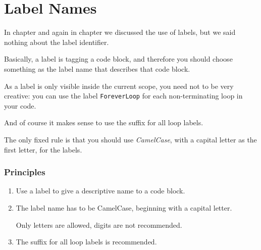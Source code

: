 \section{Label Names}\label{sec:Label}
In chapter  and again in chapter  we discussed the use of labels, but we said nothing about the label identifier.

Basically, a label is tagging a code block, and therefore you should choose something as the label name that describes that code block.

As a label is only visible inside the current scope, you need not to be very creative: you can use the label \lstinline|ForeverLoop| for each non-terminating loop in your code.

And of course it makes sense to use the suffix  for all loop labels.

The only fixed rule is that you should use \textit{CamelCase}, with a capital letter as the first letter, for the labels. 

\subsubsection{Principles}
\begin{enumerate}[label=P\arabic*.]
	\item{Use a label to give a descriptive name to a code block.}

	\item{The label name has to be CamelCase, beginning with a capital letter.
	
	Only letters are allowed, digits are not recommended.}
	
	\item{The suffix  for all loop labels is recommended.}
\end{enumerate}

